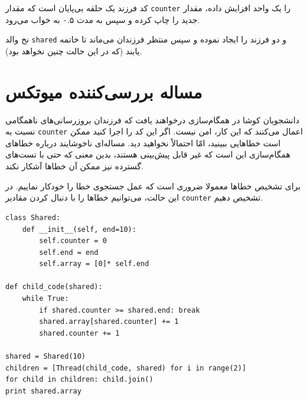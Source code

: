 \documentclass{book}
\begin{document}
    کد فرزند یک حلقه بی‌پایان است که مقدار {\tt counter} را یک واحد افزایش داده، مقدار جدید را چاپ کرده و سپس به مدت ۰.۵ به خواب می‌رود. 

    نخ والد  {\tt shared} و دو فرزند را ایجاد نموده و سپس منتظر فرزندان می‌ماند تا خاتمه یابند (که در این حالت چنین نخواهد بود).

\section{مساله بررسی‌کننده میوتکس}

    دانشجویان کوشا در همگام‌سازی درخواهند یافت که فرزندان بروزرسانی‌های ناهمگامی نسبت به {\tt counter} اعمال می‌کنند که این کار، امن نیست. 
    اگر این کد را اجرا کنید ممکن است خطاهایی ببینید، امّا احتمالاً نخواهید دید. مساله‌ای ناخوشایند درباره خطاهای همگام‌سازی این است که غیر قابل پیش‌بینی هستند، 
    بدین معنی که حتی با تست‌های  گسترده نیز  ممکن آن خطاها  آشکار نکند.
    

    برای تشخیص خطاها معمولا ضروری است که عمل جستجوی خطا را خودکار نماییم. 
    در این حالت، می‌توانیم خطاها را با دنبال کردن مقادیر  {\tt counter} تشخیص دهیم. 

\begin{latin}
\begin{lstlisting}
class Shared:
    def __init__(self, end=10):
        self.counter = 0
        self.end = end
        self.array = [0]* self.end

def child_code(shared):
    while True:
        if shared.counter >= shared.end: break
        shared.array[shared.counter] += 1
        shared.counter += 1

shared = Shared(10)
children = [Thread(child_code, shared) for i in range(2)]
for child in children: child.join()
print shared.array
\end{lstlisting}
\end{latin}
\end{document}
